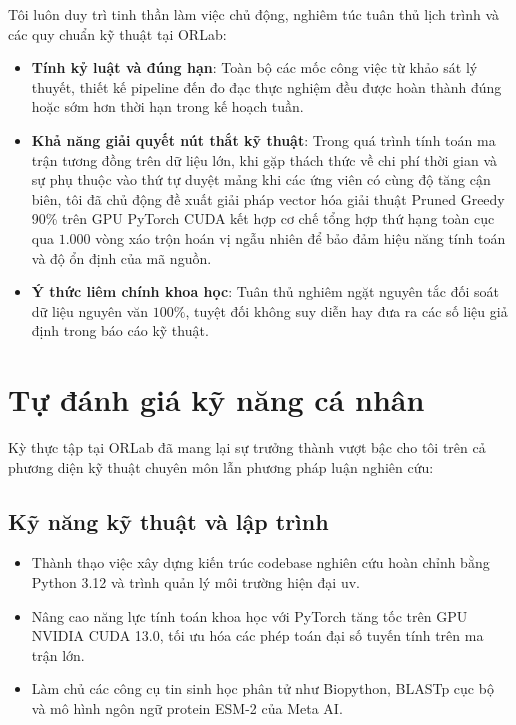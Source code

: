 Tôi luôn duy trì tinh thần làm việc chủ động, nghiêm túc tuân thủ lịch trình và các quy chuẩn kỹ thuật tại ORLab:
\begin{itemize}
    \item \textbf{Tính kỷ luật và đúng hạn}: Toàn bộ các mốc công việc từ khảo sát lý thuyết, thiết kế pipeline đến đo đạc thực nghiệm đều được hoàn thành đúng hoặc sớm hơn thời hạn trong kế hoạch tuần.
    \item \textbf{Khả năng giải quyết nút thắt kỹ thuật}: Trong quá trình tính toán ma trận tương đồng trên dữ liệu lớn, khi gặp thách thức về chi phí thời gian và sự phụ thuộc vào thứ tự duyệt mảng khi các ứng viên có cùng độ tăng cận biên, tôi đã chủ động đề xuất giải pháp vector hóa giải thuật Pruned Greedy 90\% trên GPU PyTorch CUDA kết hợp cơ chế tổng hợp thứ hạng toàn cục qua $1.000$ vòng xáo trộn hoán vị ngẫu nhiên để bảo đảm hiệu năng tính toán và độ ổn định của mã nguồn.
    \item \textbf{Ý thức liêm chính khoa học}: Tuân thủ nghiêm ngặt nguyên tắc đối soát dữ liệu nguyên văn $100\%$, tuyệt đối không suy diễn hay đưa ra các số liệu giả định trong báo cáo kỹ thuật.
\end{itemize}

\section{Tự đánh giá kỹ năng cá nhân}
\label{sec:danh_gia_ky_nang}

Kỳ thực tập tại ORLab đã mang lại sự trưởng thành vượt bậc cho tôi trên cả phương diện kỹ thuật chuyên môn lẫn phương pháp luận nghiên cứu:

\subsection{Kỹ năng kỹ thuật và lập trình}
\begin{itemize}
    \item Thành thạo việc xây dựng kiến trúc codebase nghiên cứu hoàn chỉnh bằng Python 3.12 và trình quản lý môi trường hiện đại uv.
    \item Nâng cao năng lực tính toán khoa học với PyTorch tăng tốc trên GPU NVIDIA CUDA 13.0, tối ưu hóa các phép toán đại số tuyến tính trên ma trận lớn.
    \item Làm chủ các công cụ tin sinh học phân tử như Biopython, BLASTp cục bộ và mô hình ngôn ngữ protein ESM-2 của Meta AI.
\end{itemize}

